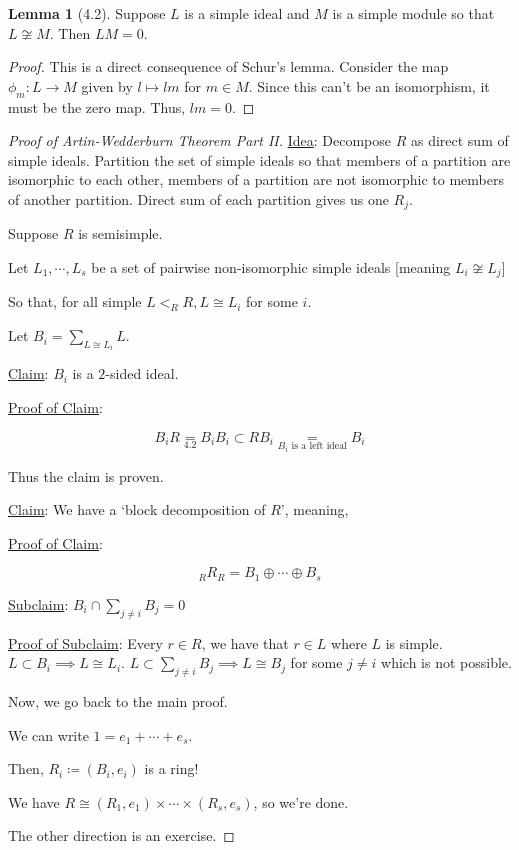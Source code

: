 \documentclass{article}
\theoremstyle{definition}
\newtheorem{lemma}[theorem]{Lemma}
\begin{document}
\begin{lemma}
    [4.2] Suppose \(L\) is a simple ideal and \(M\) is a simple module so that \(L \not\cong M\). Then \(LM = 0\).
\end{lemma}

\begin{proof}
    This is a direct consequence of Schur's lemma. Consider the map \(\phi_m: L \to M\) given by \(l \mapsto lm\) for \(m\in M\). Since this can't be an isomorphism, it must be the zero map. Thus, \(lm = 0\).
\end{proof}

\begin{proof}
    [Proof of Artin-Wedderburn Theorem Part II]

    \underline{Idea}: Decompose \(R\) as direct sum of simple ideals. Partition the set of simple ideals so that members of a partition are isomorphic to each other, members of a partition are not isomorphic to members of  another partition. Direct sum of each partition gives us one \(R_j\). 

    Suppose \(R\) is semisimple.
    
    Let \(L_1, \cdots , L_s\) be a set of pairwise non-isomorphic simple ideals [meaning \(L_i \not\cong L_j\)]

    So that, for all simple \(L < _R R, L \cong L_i\) for some \(i\).

    Let \(B_i = \sum_{L \cong L_i} L\).

    \underline{Claim}: \(B_i\) is a \(2\)-sided ideal.

    \underline{Proof of Claim}: 

    \[
        B_i R \underset{4.2}{=} B_i B_i \subset R B_i \underset{B_i \text{ is a left ideal}}{=} B_i 
    \]

    Thus the claim is proven.

    \underline{Claim}: We have a `block decomposition of \(R\)', meaning,

    \underline{Proof of Claim}:

    \[
        _R R _R = B_1 \oplus \cdots \oplus B_s
    \]

    \underline{Subclaim}: \(B_i \cap \sum_{j \neq i} B_j = 0\)
    
    \underline{Proof of Subclaim}: Every \(r\in R\), we have that \(r \in L\) where \(L\) is simple. \(L \subset B_i \implies L \cong L_i\). \(L \subset \sum_{j\neq i} B_j \implies L \cong B_j\) for some \(j \neq i\) which is not possible.

    Now, we go back to the main proof.

    We can write \(1 = e_1 + \cdots + e_s\).
    
    Then, \(R_i \coloneqq (B_i, e_i)\) is a ring!

    We have \(R \cong (R_1, e_1) \times \cdots \times (R_s, e_s)\), so we're done.

    The other direction is an exercise.

\end{proof}
\end{document}
